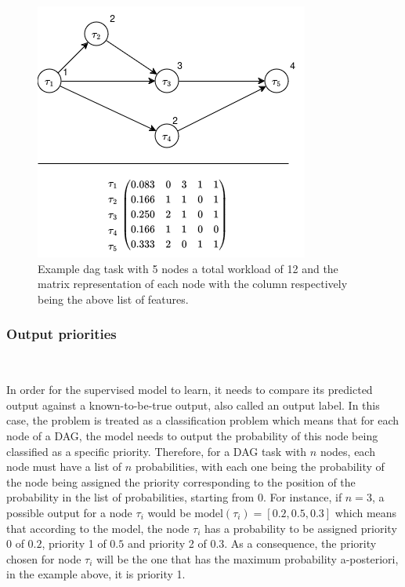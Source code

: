 \begin{figure}
    \centering
    \includegraphics[width=\linewidth]{images/dag_matrix_example.drawio.png}
    \caption{Example dag task with 5 nodes a total workload of 12
    and the matrix representation of each node with the column respectively being the above list of features.}
    \label{fig:dag_task_matrix_example}
\end{figure}

\subsubsection{Output priorities}
~
\label{sec:output_labels}

In order for the supervised model to learn, it needs to 
compare its predicted output against a known-to-be-true output, also 
called an output label. In this case,
the problem is treated as a classification problem which means 
that for each node of a DAG, the model needs to output the probability
of this node being classified as a specific priority.
Therefore, for a DAG task with $n$ nodes,
each node must have a list of $n$ probabilities,
with each one being the probability of the node being 
assigned the priority corresponding to the position of the probability in the list
of probabilities, starting from 0.
For instance, if $n = 3$, 
a possible output for a node $\tau_i$ would be
$\text{model}(\tau_i) = [0.2,0.5,0.3]$ which means that according to the model,
the node $\tau_i$ has a probability to be assigned priority 0 of $0.2$,
priority 1 of $0.5$ and priority 2 of $0.3$.
As a consequence, the priority chosen for node $\tau_i$ will be 
the one that has the maximum probability a-posteriori,
in the example above, it is priority 1.

